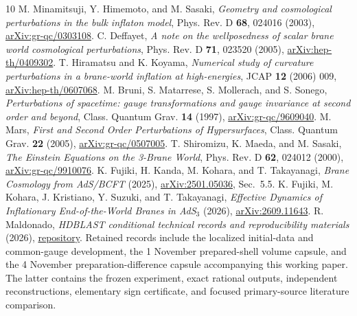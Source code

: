 \documentclass[11pt]{article}
\begin{document}
\begin{thebibliography}{10}
\footnotesize
\setlength{\itemsep}{2pt}
 M. Minamitsuji, Y. Himemoto, and M. Sasaki,
\emph{Geometry and cosmological perturbations in the bulk inflaton model},
Phys. Rev. D \textbf{68}, 024016 (2003),
\href{https://arxiv.org/abs/gr-qc/0303108}{arXiv:gr-qc/0303108}.
 C. Deffayet,
\emph{A note on the wellposedness of scalar brane world cosmological perturbations},
Phys. Rev. D \textbf{71}, 023520 (2005),
\href{https://arxiv.org/abs/hep-th/0409302}{arXiv:hep-th/0409302}.
 T. Hiramatsu and K. Koyama,
\emph{Numerical study of curvature perturbations in a brane-world inflation at high-energies},
JCAP \textbf{12} (2006) 009,
\href{https://arxiv.org/abs/hep-th/0607068}{arXiv:hep-th/0607068}.
 M. Bruni, S. Matarrese, S. Mollerach, and S. Sonego,
\emph{Perturbations of spacetime: gauge transformations and gauge invariance
at second order and beyond}, Class. Quantum Grav. \textbf{14} (1997),
\href{https://arxiv.org/abs/gr-qc/9609040}{arXiv:gr-qc/9609040}.
 M. Mars, \emph{First and Second Order Perturbations of Hypersurfaces},
Class. Quantum Grav. \textbf{22} (2005),
\href{https://arxiv.org/abs/gr-qc/0507005}{arXiv:gr-qc/0507005}.
 T. Shiromizu, K. Maeda, and M. Sasaki,
\emph{The Einstein Equations on the 3-Brane World}, Phys. Rev. D
\textbf{62}, 024012 (2000),
\href{https://arxiv.org/abs/gr-qc/9910076}{arXiv:gr-qc/9910076}.
 K. Fujiki, H. Kanda, M. Kohara, and T. Takayanagi,
\emph{Brane Cosmology from AdS/BCFT} (2025),
\href{https://arxiv.org/abs/2501.05036}{arXiv:2501.05036}, Sec.~5.5.
 K. Fujiki, M. Kohara, J. Kristiano, Y. Suzuki, and T. Takayanagi,
\emph{Effective Dynamics of Inflationary End-of-the-World Branes in AdS$_3$}
(2026), \href{https://arxiv.org/abs/2609.11643}{arXiv:2609.11643}.
 R. Maldonado, \emph{HDBLAST conditional technical records
and reproducibility materials} (2026),
\href{https://github.com/maldonado-research/HDblast}{repository}.
Retained records include the localized initial-data and common-gauge
development, the 1 November prepared-shell volume capsule, and the
4 November preparation-difference capsule accompanying this working paper.
The latter contains the frozen experiment, exact rational outputs,
independent reconstructions, elementary sign certificate, and focused
primary-source literature comparison.
\end{thebibliography}
\end{document}

